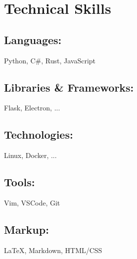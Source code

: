 \section*{Technical Skills}

\subsection*{Languages:} Python, C\#, Rust, JavaScript
\subsection*{Libraries \& Frameworks:} Flask, Electron, ...
\subsection*{Technologies:} Linux, Docker, ...
\subsection*{Tools:} Vim, VSCode, Git
\subsection*{Markup:} {\LaTeX}, Markdown, HTML/CSS
